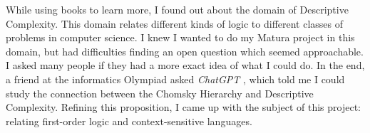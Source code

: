 While using books to learn more, I found out about the domain of Descriptive Complexity.
This domain relates different kinds of logic to different classes of problems in computer science.
I knew I wanted to do my Matura project in this domain, but had difficulties finding an open question which seemed approachable.
I asked many people if they had a more exact idea of what I could do.
In the end, a friend at the informatics Olympiad asked \emph{ChatGPT} \cite{chatgpt}, which told me I could study the connection between the Chomsky Hierarchy and Descriptive Complexity.
Refining this proposition, I came up with the subject of this project: relating first-order logic and context-sensitive languages.



